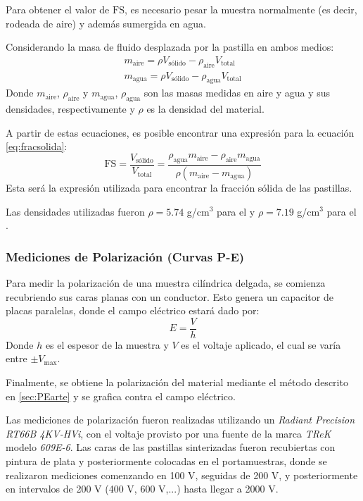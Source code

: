 \documentclass[../main.tex]{subfiles}
\begin{document}
Para obtener el valor de $\text{FS}$, es necesario pesar la muestra normalmente (es decir, rodeada de aire) y además sumergida en agua.

Considerando la masa de fluido desplazada por la pastilla en ambos medios:
\begin{equation}
    \begin{split}
        m_\text{aire}=\rho V_\text{sólido} - \rho_\text{aire} V_\text{total}\\
        m_\text{agua}=\rho V_\text{sólido} - \rho_\text{agua} V_\text{total}
    \end{split}
    \label{eq:masasaireagua}
\end{equation}
Donde $m_\text{aire}$, $\rho_\text{aire}$  y $m_\text{agua}$, $\rho_\text{agua}$ son las masas medidas en aire y agua y sus densidades, respectivamente y $\rho$ es la densidad del material.

A partir de estas ecuaciones, es posible encontrar una expresión para la ecuación \ref{eq:fracsolida}:
\begin{equation}
    \text{FS}=\dfrac{V_\text{sólido}}{V_\text{total}}=\dfrac{\rho_\text{agua}m_\text{aire}-\rho_\text{aire}m_\text{agua}}{\rho(m_\text{aire}-m_\text{agua})}
    \label{eq:fracsolidamasas}
\end{equation}
Esta será la expresión utilizada para encontrar la fracción sólida de las pastillas.

Las densidades utilizadas fueron $\rho=5.74$ g/cm$^3$ para el \neod{} \cite{densneod} y $\rho=7.19$ g/cm$^3$ para el \sama{} \cite{denssama}.

\subsubsection{Mediciones de Polarización (Curvas P-E)}
Para medir la polarización de una muestra cilíndrica delgada, se comienza recubriendo sus caras planas con un conductor. Esto genera un capacitor de placas paralelas, donde el campo eléctrico estará dado por:
\begin{equation}
    E=\dfrac{V}{h}
    \label{eq:campovoltaje}
\end{equation}
Donde $h$ es el espesor de la muestra y $V$ es el voltaje aplicado, el cual se varía entre $\pm V_\text{max}$.

Finalmente, se obtiene la polarización del material mediante el método descrito en \ref{sec:PEarte} y se grafica contra el campo eléctrico.

Las mediciones de polarización fueron realizadas utilizando un \textit{Radiant Precision RT66B 4KV-HVi}, con el voltaje provisto por una fuente de la marca \textit{TReK} modelo \textit{609E-6}. Las caras de las pastillas sinterizadas fueron recubiertas con pintura de plata y posteriormente colocadas en el portamuestras, donde se realizaron mediciones comenzando en 100 V, seguidas de 200 V, y posteriormente en intervalos de 200 V (400 V, 600 V,...) hasta llegar a 2000 V.
\end{document}
